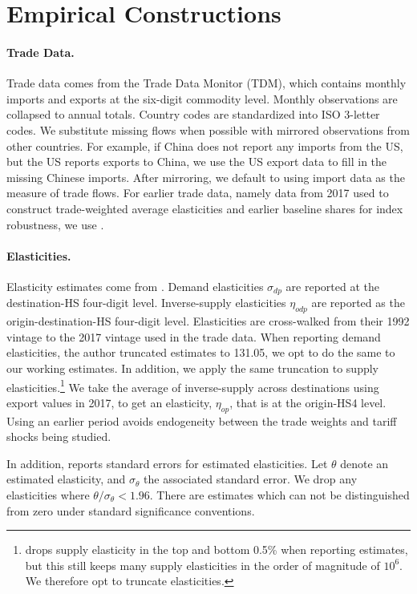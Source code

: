 \documentclass[english,12pt]{article}
\theoremstyle{definition}
\begin{document}
\section{Empirical Constructions \label{app:Index_Empirics}}

\paragraph{Trade Data. }

Trade data comes from the Trade Data Monitor (TDM), which contains monthly imports and exports at the six-digit commodity level. Monthly observations are collapsed to annual totals. Country codes are standardized into ISO 3-letter codes. We substitute missing flows when possible with mirrored observations from other countries. For example, if China does not report any imports from the US, but the US reports exports to China, we use the US export data to fill in the missing Chinese imports. After mirroring, we default to using import data as the measure of trade flows. For earlier trade data, namely data from 2017 used to construct trade-weighted average elasticities and earlier baseline shares for index robustness, we use \cite{Gaulier-Zignago_2010}. 

\paragraph{Elasticities.}

Elasticity estimates come from \cite{soderbery2018trade}. Demand elasticities $\sigma_{dp}$ are reported at the destination-HS four-digit level. Inverse-supply elasticities $\eta_{odp}$ are reported as the origin-destination-HS four-digit level. Elasticities are cross-walked from their 1992 vintage to the 2017 vintage used in the trade data. When reporting demand elasticities, the author truncated estimates to 131.05, we opt to do the same to our working estimates. In addition, we apply the same truncation to supply elasticities.\footnote{\cite{soderbery2018trade} drops supply elasticity in the top and bottom 0.5\% when reporting estimates, but this still keeps many supply elasticities in the order of magnitude of $10^{6}$. We therefore opt to truncate elasticities.} We take the average of inverse-supply across destinations using export values in 2017, to get an elasticity, $\eta_{op}$, that is at the origin-HS4 level. Using an earlier period avoids endogeneity between the trade weights and tariff shocks being studied. 

In addition, \cite{soderbery2018trade} reports standard errors for estimated elasticities. Let $\theta$ denote an estimated elasticity, and $\sigma_{\theta}$ the associated standard error. We drop any elasticities where $\theta/\sigma_{\theta}<1.96$. There are estimates which can not be distinguished from zero under standard significance conventions. 
\end{document}
